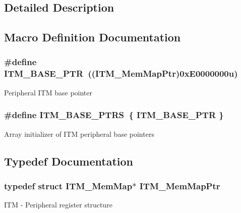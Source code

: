 \subsection{Detailed Description}


\subsection{Macro Definition Documentation}
\hypertarget{group___i_t_m___peripheral_gafaddee8fe8b6a898d4e5edc43ee0d703}{}
\subsubsection[{I\+T\+M\+\_\+\+B\+A\+S\+E\+\_\+\+P\+T\+R}]{\setlength{\rightskip}{0pt plus 5cm}\#define I\+T\+M\+\_\+\+B\+A\+S\+E\+\_\+\+P\+T\+R~(({\bf I\+T\+M\+\_\+\+Mem\+Map\+Ptr})0x\+E0000000u)}\label{group___i_t_m___peripheral_gafaddee8fe8b6a898d4e5edc43ee0d703}
Peripheral I\+T\+M base pointer \hypertarget{group___i_t_m___peripheral_gaaae5001acd70f274892c8fec6778260d}{}
\subsubsection[{I\+T\+M\+\_\+\+B\+A\+S\+E\+\_\+\+P\+T\+R\+S}]{\setlength{\rightskip}{0pt plus 5cm}\#define I\+T\+M\+\_\+\+B\+A\+S\+E\+\_\+\+P\+T\+R\+S~\{ {\bf I\+T\+M\+\_\+\+B\+A\+S\+E\+\_\+\+P\+T\+R} \}}\label{group___i_t_m___peripheral_gaaae5001acd70f274892c8fec6778260d}
Array initializer of I\+T\+M peripheral base pointers 

\subsection{Typedef Documentation}
\hypertarget{group___i_t_m___peripheral_ga4a7413c0256960668a95765d8b74e5b3}{}
\subsubsection[{I\+T\+M\+\_\+\+Mem\+Map\+Ptr}]{\setlength{\rightskip}{0pt plus 5cm}typedef struct {\bf I\+T\+M\+\_\+\+Mem\+Map}$\ast$ {\bf I\+T\+M\+\_\+\+Mem\+Map\+Ptr}}\label{group___i_t_m___peripheral_ga4a7413c0256960668a95765d8b74e5b3}
I\+T\+M -\/ Peripheral register structure 